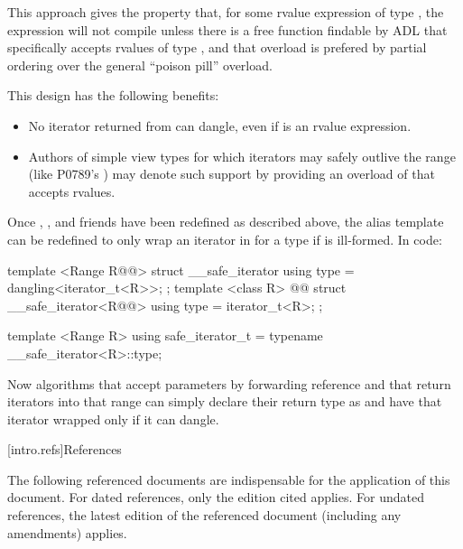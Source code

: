 This approach gives  the property that,
for some rvalue expression  of type , the expression
will not compile unless there is a free function  findable by
ADL that specifically accepts rvalues of type , and that overload is
prefered by partial ordering over the general  ``poison
pill'' overload.

\pnum
This design has the following benefits:

\begin{itemize}
\item No iterator returned from 
can dangle, even if  is an rvalue expression.
\item Authors of simple view types for which iterators may safely outlive the
range (like P0789's ) may denote such support by providing an
overload of  that accepts rvalues.
\end{itemize}

\pnum
Once , , and friends have
been redefined as described above, the  alias template
can be redefined to only wrap an iterator in  for a
 type  if
 is ill-formed. In
code:

\begin{codeblock}
template <Range R@@>
struct __safe_iterator {
  using type = dangling<iterator_t<R>>;
};
template <class R>
  @@
struct __safe_iterator<R@@> {
  using type = iterator_t<R>;
};

template <Range R>
using safe_iterator_t = typename __safe_iterator<R>::type;
\end{codeblock}

Now algorithms that accept  parameters by forwarding reference and
that return iterators into that range can simply declare their return type as
 and have that iterator wrapped only if it can dangle.

[intro.refs]{References}

\pnum
The following referenced documents are indispensable for the
application of this document. For dated references, only the
edition cited applies. For undated references, the latest edition
of the referenced document (including any amendments) applies.

